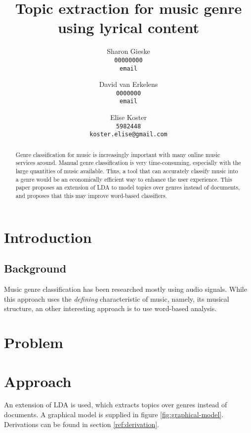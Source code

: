 \documentclass{article} %
\title{Topic extraction for music genre using lyrical content}
\author{
Sharon Gieske \\
\texttt{00000000}\\
\texttt{email} \\
\and
David van Erkelens\\
\texttt{0000000}\\
\texttt{email} \\
\and
Elise Koster \\
\texttt{5982448}\\
\texttt{koster.elise@gmail.com}
}
\begin{document}
\maketitle

\begin{abstract}
Genre classification for music is increasingly important with many online music services around. Manual genre classification is very time-consuming, especially with the large quantities of music available. Thus, a tool that can accurately classify music into a genre would be an economically efficient way to enhance the user experience. This paper proposes an extension of LDA to model topics over genres instead of documents, and proposes that this may improve word-based classifiers.
\end{abstract}

\section{Introduction}

	\subsection{Background}
Music genre classification has been researched mostly using audio signals. While this approach uses the \textit{defining} characteristic of music, namely, its musical structure, an other interesting approach is to use word-based analysis.

\section{Problem}

\section{Approach}
An extension of LDA is used, which extracts topics over genres instead of documents. A graphical model is supplied in figure \ref{fig:graphical-model}. Derivations can be found in section \ref{ref:derivation}.
\end{document}
